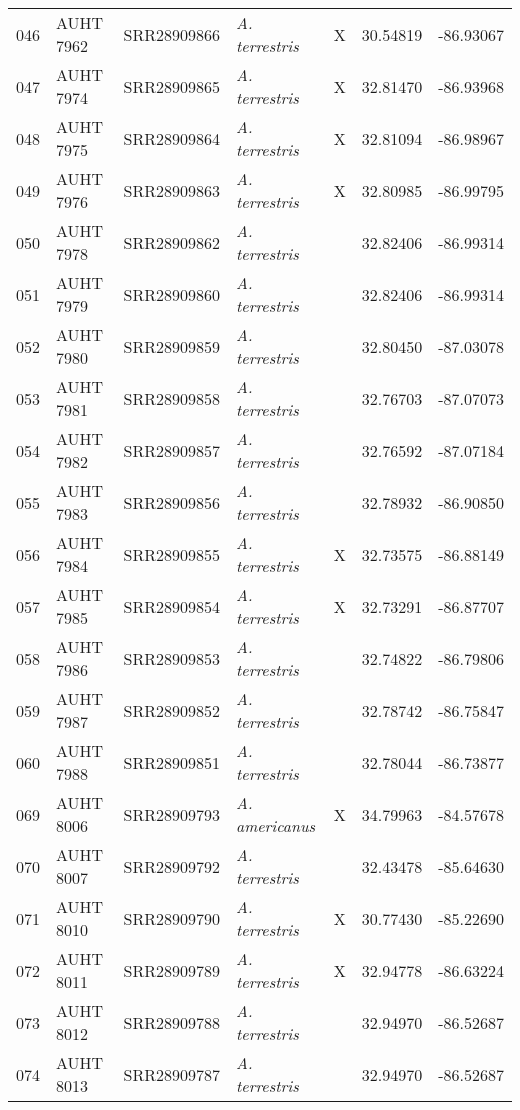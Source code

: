 \begin{longtable}{ lllllll }
046 & AUHT 7962 & SRR28909866 & \textit{A. terrestris} & X & 30.54819 & -86.93067 \\ 
047 & AUHT 7974 & SRR28909865 & \textit{A. terrestris} & X & 32.81470 & -86.93968 \\ 
048 & AUHT 7975 & SRR28909864 & \textit{A. terrestris} & X & 32.81094 & -86.98967 \\ 
049 & AUHT 7976 & SRR28909863 & \textit{A. terrestris} & X & 32.80985 & -86.99795 \\ 
050 & AUHT 7978 & SRR28909862 & \textit{A. terrestris} &  & 32.82406 & -86.99314 \\ 
051 & AUHT 7979 & SRR28909860 & \textit{A. terrestris} &  & 32.82406 & -86.99314 \\ 
052 & AUHT 7980 & SRR28909859 & \textit{A. terrestris} &  & 32.80450 & -87.03078 \\ 
053 & AUHT 7981 & SRR28909858 & \textit{A. terrestris} &  & 32.76703 & -87.07073 \\ 
054 & AUHT 7982 & SRR28909857 & \textit{A. terrestris} &  & 32.76592 & -87.07184 \\ 
055 & AUHT 7983 & SRR28909856 & \textit{A. terrestris} &  & 32.78932 & -86.90850 \\ 
056 & AUHT 7984 & SRR28909855 & \textit{A. terrestris} & X & 32.73575 & -86.88149 \\ 
057 & AUHT 7985 & SRR28909854 & \textit{A. terrestris} & X & 32.73291 & -86.87707 \\ 
058 & AUHT 7986 & SRR28909853 & \textit{A. terrestris} &  & 32.74822 & -86.79806 \\ 
059 & AUHT 7987 & SRR28909852 & \textit{A. terrestris} &  & 32.78742 & -86.75847 \\ 
060 & AUHT 7988 & SRR28909851 & \textit{A. terrestris} &  & 32.78044 & -86.73877 \\ 
069 & AUHT 8006 & SRR28909793 & \textit{A. americanus} & X & 34.79963 & -84.57678 \\ 
070 & AUHT 8007 & SRR28909792 & \textit{A. terrestris} &  & 32.43478 & -85.64630 \\ 
071 & AUHT 8010 & SRR28909790 & \textit{A. terrestris} & X & 30.77430 & -85.22690 \\ 
072 & AUHT 8011 & SRR28909789 & \textit{A. terrestris} & X & 32.94778 & -86.63224 \\ 
073 & AUHT 8012 & SRR28909788 & \textit{A. terrestris} &  & 32.94970 & -86.52687 \\ 
074 & AUHT 8013 & SRR28909787 & \textit{A. terrestris} &  & 32.94970 & -86.52687 \\ 

\end{longtable}
